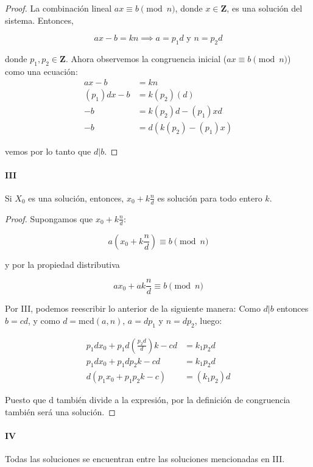 \documentclass{article}
\begin{document}
\begin{proof}
La combinación lineal $ax \equiv b \pmod{n}$, donde $x \in \mathbf{Z}$, es una solución del sistema. Entonces,
    
    $$ax -b = kn \implies a = p_1 d \text{ y } n = p_2 d$$

donde $p_1, p_2 \in \mathbf{Z}$. Ahora observemos la congruencia inicial ($ax \equiv b \pmod{n}$) como una ecuación:
\begin{align*}
    ax - b &= kn\\
    (p_1)dx - b &= k(p_2)(d)\\
    -b &= k(p_2)d - (p_1)xd\\
    -b &= d(k(p_2) - (p_1)x)
\end{align*}

vemos por lo tanto que $d|b$.
\end{proof}

\paragraph{III} Si $X_0$ es una solución, entonces, $x_0 + k \frac{n}{d}$ es solución para todo entero $k$.

\begin{proof}
Supongamos que $x_0 + k \frac{n}{d}$:

$$a\left(x_0 + k \frac{n}{d}\right) \equiv b \pmod{n}$$

y por la propiedad distributiva

$$ax_0 + ak \frac{n}{d} \equiv b \pmod{n}$$

Por III, podemos reescribir lo anterior de la siguiente manera: Como $d|b$ entonces $b=cd$, y como $d=\text{mcd}(a,n)$, $a=dp_1$ y $n = d p_2$, luego:

\begin{align*}
    p_1dx_0 + p_1d \left(\frac{p_2d}{d}\right)k - cd &= k_1p_2d\\
    p_1dx_0 + p_1d p_2 k - cd &= k_1p_2d\\
    d(p_1x_0 + p_1 p_2 k - c) &= (k_1p_2)d
\end{align*}

Puesto que d también divide a la expresión, por la definición de congruencia también será una solución.
\end{proof}

\paragraph{IV} Todas las soluciones se encuentran entre las soluciones mencionadas en III.
\end{document}

